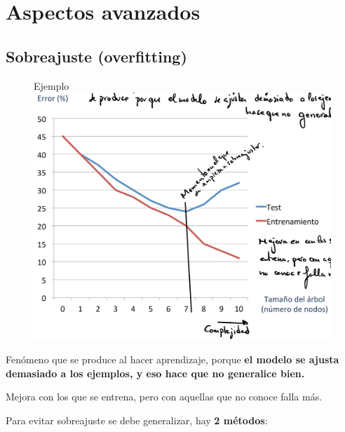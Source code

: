 \documentclass[12pt, twoside, openright]{report} %
\begin{document}
\section{Aspectos avanzados}

\subsection{Sobreajuste
	(overfitting)}

\begin{figure}[H]
	Ejemplo
	{\includegraphics[scale=.2]{image-20210305195646416.png}}
\end{figure}

Fenómeno que se produce al hacer aprendizaje, porque \textbf{el modelo
	se ajusta demasiado a los ejemplos, y eso hace que no generalice bien.}

Mejora con los que se entrena, pero con aquellas que no conoce falla
más.

Para evitar sobreajuste se debe generalizar, hay \textbf{2 métodos}:
\end{document}
